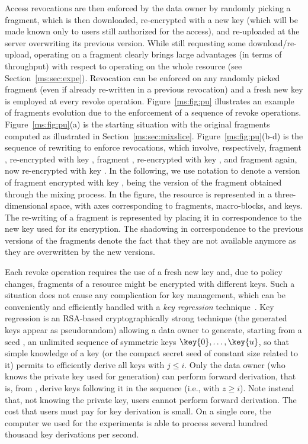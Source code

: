 Access revocations are then enforced by the data owner by randomly picking a fragment, which is then downloaded, re-encrypted with a new key (which will be made known only to users still authorized for the access), and re-uploaded at the server overwriting its previous version. While still requesting some download/re-upload, operating on a fragment clearly brings large advantages (in terms of throughput) with respect to operating on the whole resource (see Section~\ref{ms:sec:expe}). Revocation can be enforced on any randomly picked fragment (even if already re-written in a previous revocation) and a fresh new key is employed at every revoke operation. Figure~\ref{ms:fig:pu} illustrates an example of fragments evolution due to the enforcement of a sequence of revoke operations. Figure~\ref{ms:fig:pu}(a) is the starting situation with the original fragments computed as illustrated in Section~\ref{ms:sec:mixslice}. Figure~\ref{ms:fig:pu}(b-d) is the sequence of rewriting to enforce revocations, which involve, respectively, fragment , re-encrypted with key , fragment , re-encrypted with key , and fragment  again, now re-encrypted with key . In the following, we use notation  to denote a version of fragment  encrypted with key , being  the version of the fragment obtained through the mixing process. In the figure, the resource is represented in a three-dimensional space, with axes corresponding to fragments, macro-blocks, and keys. The re-writing of a fragment is represented by placing it in correspondence to the new key used for its encryption. The shadowing in correspondence to the previous versions of the fragments denote the fact that they are not available anymore as they are overwritten by the new versions.

Each revoke operation requires the use of a fresh new key and, due to policy changes, fragments of a resource might be encrypted with different keys. Such a situation does not cause any complication for key management, which can be conveniently and efficiently handled with a {\em key regression\/} technique~\cite{fkk06}. Key regression is an RSA-based cryptographically strong technique (the generated keys appear as pseudorandom) allowing a data owner to generate, starting from a seed , an unlimited sequence of symmetric keys $\key{0},\ldots,\key{u}$, so that simple knowledge of a key  (or the compact secret seed  of constant size related to it) permits to efficiently derive all keys  with $j\leq i$. Only the data owner (who knows the private key used for generation) can perform forward derivation, that is, from , derive keys following it in the sequence (i.e.,  with $z\geq i$). Note instead that, not knowing the private key, users cannot perform forward derivation. The cost that users must pay for key derivation is small. On a single core, the computer we used for the experiments is able to process several hundred thousand key derivations per second.

